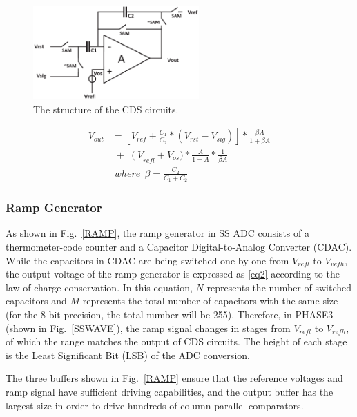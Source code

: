 \begin{figure}[htbp]
	\centerline{\includegraphics[width=2.5in]{./Figures/CDS.eps}}
	\caption{The structure of the CDS circuits.}
	\label{CDS}
\end{figure} 

\begin{equation}
	\begin{aligned}
		V_{out}&=\left[ V_{ref}+\frac{C_1}{C_2}\ast\left(V_{rst}-V_{sig}\right)\right]\ast\frac{\beta A}{1+\beta A}\\
		&\;{+}\;\left(V\right._{refl}+V_{os})\ast\frac{A}{1+A}\ast\frac{1}{\beta A}\\
		&\;where\ \ \beta=\frac{C_2}{C_1+C_2}
		\label{eq1}
	\end{aligned}
\end{equation}

\subsubsection{Ramp Generator}

As shown in Fig.~\ref{RAMP}, the ramp generator in SS ADC consists of a thermometer-code counter and a Capacitor Digital-to-Analog Converter (CDAC). 
While the capacitors in CDAC are being switched one by one from $V_{refl}$ to $V_{vefh}$, the output voltage of the ramp generator is expressed as \eqref{eq2} according to the law of charge conservation. 
In this equation, $N$ represents the number of switched capacitors and $M$ represents the total number of capacitors with the same size (for the 8-bit precision, the total number will be 255). 
Therefore, in PHASE3 (shown in Fig.~\ref{SSWAVE}), the ramp signal changes in stages from $V_{refl}$ to $V_{refh}$, of which the range matches the output of CDS circuits. 
The height of each stage is the Least Significant Bit (LSB) of the ADC conversion.

The three buffers shown in Fig.~\ref{RAMP} ensure that the reference voltages and ramp signal have sufficient driving capabilities, 
and the output buffer has the largest size in order to drive hundreds of column-parallel comparators.

